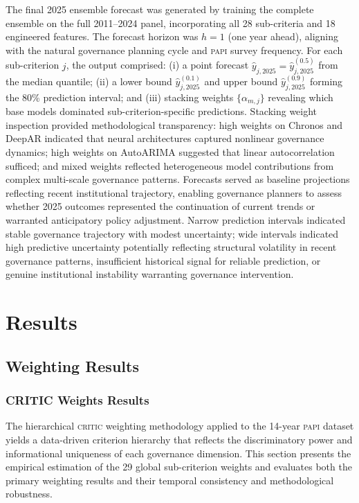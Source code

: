 \documentclass[12pt,a4paper]{article}
\newcommand{\PAPI}{\textsc{papi}\xspace}
\newcommand{\CRITIC}{\textsc{critic}\xspace}
\begin{document}
The final 2025 ensemble forecast was generated by training the complete ensemble on the full 2011--2024 panel, incorporating all 28 sub-criteria and 18 engineered features. The forecast horizon was $h=1$ (one year ahead), aligning with the natural governance planning cycle and \PAPI survey frequency. For each sub-criterion $j$, the output comprised: (i) a point forecast $\hat{y}_{j,2025} = \hat{y}_{j,2025}^{(0.5)}$ from the median quantile; (ii) a lower bound $\hat{y}_{j,2025}^{(0.1)}$ and upper bound $\hat{y}_{j,2025}^{(0.9)}$ forming the 80\% prediction interval; and (iii) stacking weights $\{\alpha_{m,j}\}$ revealing which base models dominated sub-criterion-specific predictions. Stacking weight inspection provided methodological transparency: high weights on Chronos and DeepAR indicated that neural architectures captured nonlinear governance dynamics; high weights on AutoARIMA suggested that linear autocorrelation sufficed; and mixed weights reflected heterogeneous model contributions from complex multi-scale governance patterns. Forecasts served as baseline projections reflecting recent institutional trajectory, enabling governance planners to assess whether 2025 outcomes represented the continuation of current trends or warranted anticipatory policy adjustment. Narrow prediction intervals indicated stable governance trajectory with modest uncertainty; wide intervals indicated high predictive uncertainty potentially reflecting structural volatility in recent governance patterns, insufficient historical signal for reliable prediction, or genuine institutional instability warranting governance intervention.

\section{Results}
\label{sec:results}

\subsection{Weighting Results}
\label{subsec:results_weights}

\subsubsection{CRITIC Weights Results}

The hierarchical \CRITIC weighting methodology applied to the 14-year \PAPI dataset yields a data-driven criterion hierarchy that reflects the discriminatory power and informational uniqueness of each governance dimension. This section presents the empirical estimation of the 29 global sub-criterion weights and evaluates both the primary weighting results and their temporal consistency and methodological robustness.
\end{document}
